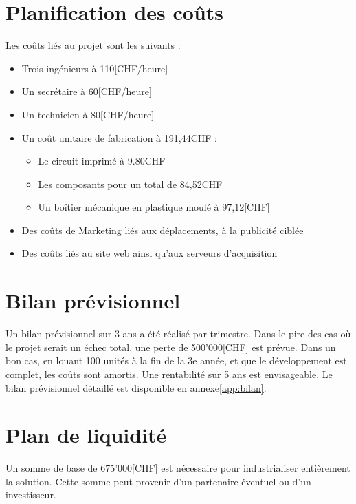 \section{Planification des coûts}
Les coûts liés au projet sont les suivants :
\begin{itemize}
    \item Trois ingénieurs à 110[CHF/heure]
    \item Un secrétaire à 60[CHF/heure]
    \item Un technicien à 80[CHF/heure]
    \item Un coût unitaire de fabrication à 191,44CHF :
    \begin{itemize}
        \item Le circuit imprimé à 9.80CHF
        \item Les composants pour un total de 84,52CHF
        \item Un boîtier mécanique en plastique moulé à 97,12[CHF]
    \end{itemize}
    \item Des coûts de Marketing liés aux déplacements, à la publicité ciblée
    \item Des coûts liés au site web ainsi qu'aux serveurs d'acquisition
\end{itemize}

\section{Bilan prévisionnel}
Un bilan prévisionnel sur 3 ans a été réalisé par trimestre.
Dans le pire des cas où le projet serait un échec total,
une perte de 500'000[CHF] est prévue.
Dans un bon cas, en louant 100 unités à la fin de la 3e année,
et que le développement est complet, les coûts sont amortis. Une
rentabilité sur 5 ans est envisageable.
Le bilan prévisionnel détaillé est disponible en annexe\ref{app:bilan}.

\section{Plan de liquidité}
Un somme de base de 675'000[CHF] est nécessaire pour industrialiser
entièrement la solution. Cette somme peut provenir d'un partenaire
éventuel ou d'un investisseur.